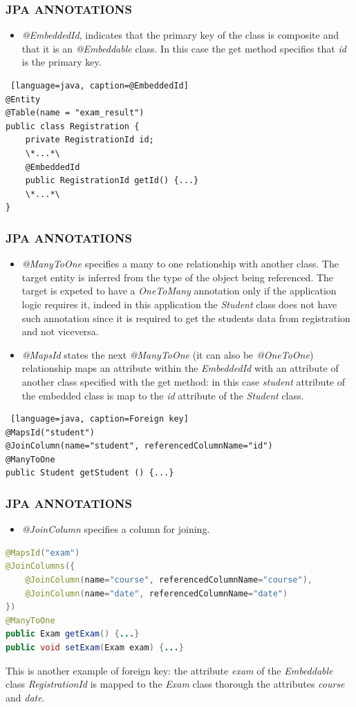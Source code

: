 \documentclass{beamer}
\begin{document}
\begin{frame} [fragile]
	\frametitle{JPA ANNOTATIONS}
	\begin{itemize}
		\item \textit{@EmbeddedId}, indicates that the primary key of the class is composite and that it is an \textit{@Embeddable} class. In this case the get method specifies that \textit{id} is the primary key.
	\end{itemize}
	\begin{lstlisting} [language=java, caption=@EmbeddedId]
@Entity
@Table(name = "exam_result")
public class Registration {
	private RegistrationId id;
	\*...*\
	@EmbeddedId
	public RegistrationId getId() {...}
	\*...*\
}
	\end{lstlisting}
\end{frame}

\begin{frame} [fragile]
	\frametitle{JPA ANNOTATIONS}
	\begin{itemize}
		\item \textit{@ManyToOne} specifies a many to one relationship with another class. The target entity is inferred from the type of the object being referenced. The target is expeted to have a \textit{OneToMany} annotation only if the application logic requires it, indeed in this application the \textit{Student} class does not have such annotation since it is required to get the students data from registration and not viceversa.
		\item \textit{@MapsId} states the next \textit{@ManyToOne} (it can also be \textit{@OneToOne}) relationship maps an attribute within the \textit{EmbeddedId} with an attribute of another class specified with the get method: in this case \textit{student} attribute of the embedded class is map to the \textit{id} attribute of the \textit{Student} class.
	\end{itemize}
	\begin{lstlisting} [language=java, caption=Foreign key]
@MapsId("student")
@JoinColumn(name="student", referencedColumnName="id")
@ManyToOne
public Student getStudent () {...}\end{lstlisting}
\end{frame}

\begin{frame} [fragile]
	\frametitle{JPA ANNOTATIONS}
	\begin{itemize}
		\item \textit{@JoinColumn} specifies a column for joining.
	\end{itemize}
	\begin{lstlisting}[language=java, caption=Foreign key]
@MapsId("exam")
@JoinColumns({
	@JoinColumn(name="course", referencedColumnName="course"),
	@JoinColumn(name="date", referencedColumnName="date")
})
@ManyToOne
public Exam getExam() {...}
public void setExam(Exam exam) {...}\end{lstlisting}
This is another example of foreign key: the attribute \textit{exam} of the \textit{Embeddable} class \textit{RegistrationId} is mapped to the \textit{Exam} class thorough the attributes \textit{course} and \textit{date}.
\end{frame}
\end{document}
